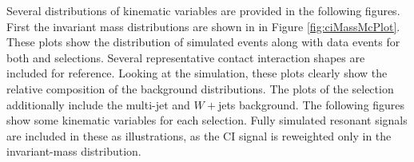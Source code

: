 Several distributions of kinematic variables are provided in the following figures.
First the invariant mass distributions are shown in in Figure \ref{fig:ciMassMcPlot}.
These plots show the distribution of simulated events along with data events for both \ee and \mm selections.
Several representative contact interaction shapes are included for reference.
Looking at the simulation, these plots clearly show the relative composition of the background distributions.
The plots of the \ee selection additionally include the multi-jet and $W+$jets background.
The following figures show some kinematic variables for each selection.
Fully simulated resonant signals are included in these as illustrations, as the CI signal is reweighted only in the invariant-mass distribution.

